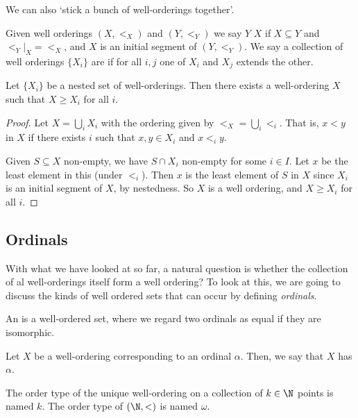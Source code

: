 \documentclass[a4paper]{scrartcl}
\begin{document}
We can also `stick a bunch of well-orderings together'.

\begin{definition}
  Given well orderings $(X, <_X)$ and $(Y, <_Y)$ we say $Y$  $X$ if $X \subseteq Y$ and $\left.<_Y\right|_X = <_X$, and $X$ is an initial segment of $(Y, <_Y)$. 
We say a collection of well orderings $\{X_i\}$ are  if for all $i, j$ one of $X_i$ and $X_j$ extends the other.
\end{definition}

\begin{proposition}
  Let $\{X_i\}$ be a nested set of well-orderings. Then there exists a well-ordering $X$ such that $X \geq X_i$ for all $i$.
\end{proposition}
\begin{proof}
  Let $X = \bigcup_i X_i$ with the ordering given by $<_X = \bigcup_i <_i$. That is, $x < y$ in $X$ if there exists $i$ such that $x, y \in X_i$ and $x <_i y$.

  Given $S \subseteq X$ non-empty, we have $S \cap X_i$ non-empty for some $i\in I$. Let $x$ be the least element in this (under $<_i$). Then $x$ is the least element of $S$ in $X$ since $X_i$ is an initial segment of $X$, by nestedness. So $X$ is a well ordering, and $X \geq X_i$ for all $i$.
\end{proof}



\subsection{Ordinals}

With what we have looked at so far, a natural question is whether the collection of al well-orderings itself form a well ordering? To look at this, we are going to discuss the kinds of well ordered sets that can occur by defining \emph{ordinals}.

\begin{definition}[Ordinal]
  An  is a well-ordered set, where we regard two ordinals as equal if they are isomorphic.
\end{definition}

\begin{definition}
  Let $X$ be a well-ordering corresponding to an ordinal $\alpha$. Then, we say that $X$ has  $\alpha$.
\end{definition}

The order type of the unique well-ordering on a collection of $k \in \N$ points is named $k$. The order type of $(\N, <)$ is named $\omega$. 
\end{document}
